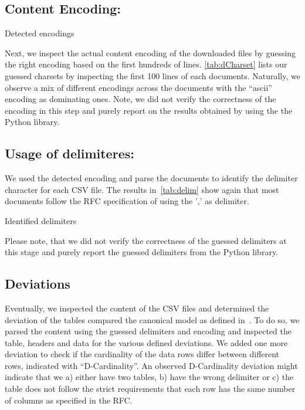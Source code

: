 \documentclass{scrartcl}
\begin{document}
\subsection{Content Encoding:}
\begin{table}[h]
\centering

\caption{Detected encodings\label{tab:dCharset}}
\end{table}

Next, we inspect the actual content encoding of the downloaded files by guessing the right encoding based on the first hundreds of lines. 
\autoref{tab:dCharset} lists our guessed charsets by inspecting the first 100 lines of each documents.  
Naturally, we observe a mix of different encodings across the documents with the ``ascii'' encoding as dominating ones. 
Note, we did not verify the correctness of the encoding in this step and purely report on the results obtained by using the the Python library.


\subsection{Usage of delimiteres:}
We used the detected encoding and parse the documents to identify the delimiter character for each CSV file. 
The results in~\autoref{tab:delim} show again that most documents follow the RFC specification of using the ',' as delimiter.
\begin{table}[h]
\centering

\caption{Identified delimiters\label{tab:delim}}
\end{table}
Please note, that we did not verify the correctness of the guessed delimiters at this stage and purely report the guessed delimiters from the Python library. 

\subsection{Deviations}
Eventually, we inspected the content of the CSV files and determined the deviation of the tables compared the canonical model as defined in~\cite{ermilov:2013aa}.
To do so, we parsed the content using the guessed delimiters and encoding and inspected the table, headers and data for the various defined deviations. 
We added one more deviation to check if the cardinality of the data rows differ between different rows, indicated with ``D-Cardinality''.
An observed D-Cardinality deviation might indicate that we a) either have two tables, b) have the wrong delimiter or c) the table does not follow the strict requirements that each row has the same number of columns as specified in the RFC.
\end{document}
